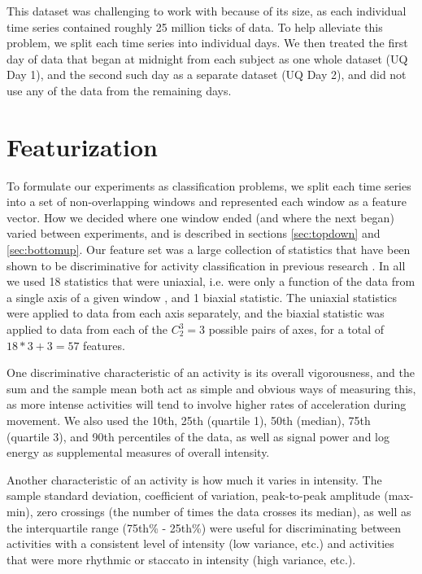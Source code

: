 This dataset was challenging to work with because of its size, as each individual time series
contained roughly 25 million ticks of data. To help alleviate this problem, we split each
time series into individual days. We then treated the first day of data that began at midnight
from each subject as one whole dataset (UQ Day 1), and the second such day as a separate dataset
(UQ Day 2), and did not use any of the data from the remaining days.


\section{Featurization}
To formulate our experiments as classification problems, we split each time series into a set of
non-overlapping windows and represented each window as a feature vector.
How we decided where one window ended (and where the next began) varied between
experiments, and is described in sections \ref{sec:topdown} and \ref{sec:bottomup}. Our feature
set was a large collection of statistics that have been shown to be discriminative
for activity classification in previous research \cite{li09} \cite{rothney07}
\cite{staudenmeyer09} \cite{zheng12}. In all we used 18 statistics that were
uniaxial, i.e. were only a function of the data from a single axis of a given window
, and 1 biaxial statistic.
The uniaxial statistics were applied to data from each axis separately, and
the biaxial statistic was applied to data from each of the $C_2^3=3$ possible pairs of
axes, for a total of $18*3+3 = 57$ features.

One discriminative characteristic of an activity is its overall vigorousness,
and the sum and the sample mean both act as simple and obvious ways of measuring this,
as more intense activities will tend to involve
higher rates of acceleration during movement. We also used the 10th, 25th (quartile 1),
50th (median), 75th (quartile 3), and 90th percentiles of the data, as well as signal
power and log energy as supplemental measures of overall intensity.

Another characteristic of an activity is how much it varies in intensity. The sample standard
deviation, coefficient of variation, peak-to-peak amplitude (max-min), zero crossings
(the number of times the data crosses its median), as well as the
interquartile range (75th\% - 25th\%) were useful for discriminating between activities
with a consistent level of intensity (low variance, etc.) and activities that were more
rhythmic or staccato in intensity (high variance, etc.). 

